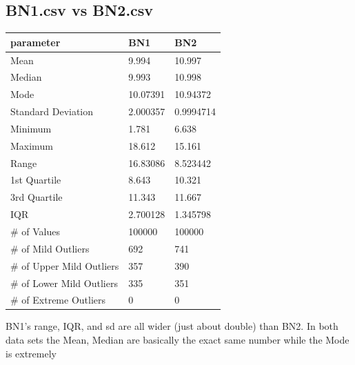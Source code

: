 \documentclass[10pt]{article}
\begin{document}
\subsection*{BN1.csv vs BN2.csv}
\begin{table}[h!]
  \begin{center}
    \scriptsize
    \begin{tabular}{lll}
      \toprule
      parameter & BN1 & BN2\\
      \midrule
 	Mean & 9.994 & 10.997\\
	Median & 9.993 & 10.998\\
	Mode & 10.07391 & 10.94372\\
	Standard Deviation & 2.000357 & 0.9994714\\
	Minimum & 1.781 & 6.638\\
	Maximum & 18.612 & 15.161\\
	Range & 16.83086 & 8.523442\\
	1st Quartile & 8.643 & 10.321\\
	3rd Quartile & 11.343 & 11.667\\
	IQR & 2.700128 & 1.345798\\   
	\# of Values & 100000 & 100000\\  
	\# of Mild Outliers & 692 & 741\\
	\# of Upper Mild Outliers & 357 & 390\\
	\# of Lower Mild Outliers & 335 & 351\\
	\# of Extreme Outliers & 0 & 0\\
       \bottomrule
    \end{tabular}
  \end{center}
\end{table}

\par
{}%
\hfill
{}%
\par
BN1's range, IQR, and sd are all wider (just about double) than BN2. In both data sets the Mean, Median are basically the exact same number while the Mode is extremely
\end{document}
